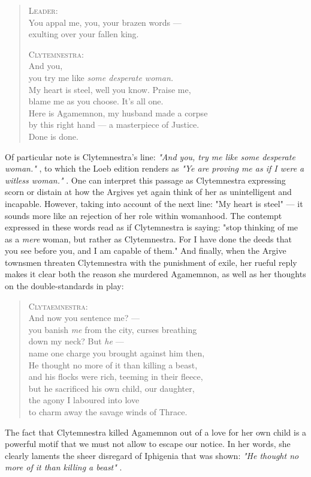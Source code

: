 \begin{quote}
  \textsc{Leader}:\\
  You appal me, you, your brazen words --- \\
  exulting over your fallen king.

  \textsc{Clytemnestra}: \\
  And you, \\
  you try me like \emph{some desperate woman.} \\
  My heart is steel, well you know. Praise me, \\
  blame me as you choose. It's all one. \\
  Here is Agamemnon, my husband made a corpse \\
  by this right hand --- a masterpiece of Justice. \\
  Done is done.

  \autocite[1425]{fagles}
\end{quote}

\noindent
Of particular note is Clytemnestra's line: \emph{"And you, try me like some
desperate woman."} \autocite[1426]{fagles}, to which the Loeb edition renders as
\emph{"Ye are proving me as if I were a witless woman."} \autocite[1426]{loeb}.
One can interpret this passage as Clytemnestra expressing scorn or distain at
how the Argives yet again think of her as unintelligent and incapable. However,
taking into account of the next line: "My heart is steel" --- it sounds more
like an rejection of her role within womanhood. The contempt expressed in these
words read as if Clytemnestra is saying: "stop thinking of me as a \emph{mere}
woman, but rather as Clytemnestra. For I have done the deeds that you see
before you, and I am capable of them." And finally, when the Argive townsmen
threaten Clytemnestra with the punishment of exile, her rueful reply makes it
clear both the reason she murdered Agamemnon, as well as her thoughts on the
double-standards in play:

\begin{quote}
  \textsc{Clytaemnestra}:\\
  And now you sentence me? ---\\
  you banish \emph{me} from the city, curses breathing \\
  down my neck? But \emph{he} ---\\
  name one charge you brought against him then,\\
  He thought no more of it than killing a beast,\\
  and his flocks were rich, teeming in their fleece,\\
  but he sacrificed his own child, our daughter,\\
  the agony I laboured into love\\
  to charm away the savage winds of Thrace.

  \autocite[1437]{fagles}
\end{quote}

\noindent
The fact that Clytemnestra killed Agamemnon out of a love for her own child is
a powerful motif that we must not allow to escape our notice. In her words, she
clearly laments the sheer disregard of Iphigenia that was shown: \emph{"He
thought no more of it than killing a beast"} \autocite[1440]{fagles}.
